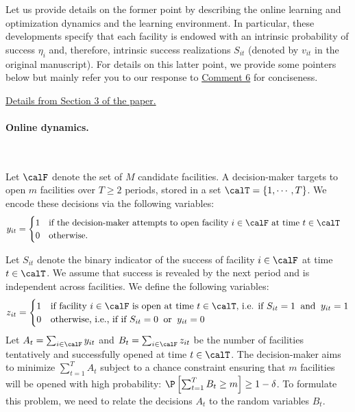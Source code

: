 \documentclass[11pt]{article}
\begin{document}
Let us provide details on the former point by describing the online learning and optimization dynamics and the learning environment. In particular, these developments specify that each facility is endowed with an intrinsic probability of success $\eta_i$ and, therefore, intrinsic success realizations $S_{it}$ (denoted by $v_{it}$ in the original manuscript). For details on this latter point, we provide some pointers below but mainly refer you to our response to \hyperref[R2:6]{\color{blue}Comment 6} for conciseness.

\underline{Details from Section 3 of the paper.}

\paragraph{Online dynamics.}\

Let $\calF$ denote the set of $M$ candidate facilities. A decision-maker targets to open $m$ facilities over $T\geq 2$ periods, stored in a set $\calT=\{1,\cdots,T\}$. We encode these decisions via the following variables:
\begin{align*}
    y_{it}&=\begin{cases}
        1&\text{if the decision-maker attempts to open facility $i\in\calF$ at time $t\in\calT$}\\
        0&\text{otherwise.}
    \end{cases}
\end{align*}

Let $S_{it}$ denote the binary indicator of the success of facility $i\in\calF$ at time $t\in\calT$. We assume that success is revealed by the next period and is independent across facilities. We define the following variables:
\begin{equation}\label{eq:z_R2}
    z_{it} = \begin{cases}
        1 & \text{if facility $i\in\calF$ is open at time $t\in\calT$, i.e. if}\ S_{it} = 1 \;\; \text{and}\;\; y_{it}=1\\ 
        0 & \text{otherwise, i.e., if}\ \text{if}\ S_{it} = 0 \;\; \text{or}\;\; y_{it}=0
    \end{cases}
\end{equation}
Let $A_t=\sum_{i\in\calF}y_{it}$ and $B_t=\sum_{i\in\calF}z_{it}$ be the number of facilities tentatively and successfully opened at time $t\in\calT$. The decision-maker aims to minimize $\sum_{t=1}^T A_t$ subject to a chance constraint ensuring that $m$ facilities will be opened with high probability: $\P\left[\sum_{t=1}^TB_t\geq m\right]\geq1-\delta$. To formulate this problem, we need to relate the decisions $A_t$ to the random variables $B_t$.
\end{document}
